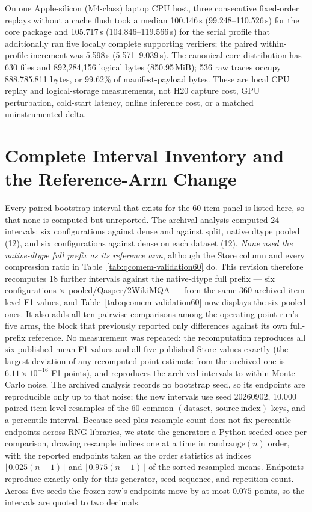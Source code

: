 \documentclass{article}
\begin{document}
On one Apple-silicon (M4-class) laptop CPU host, three consecutive fixed-order
replays without a
cache flush took a median 100.146\,s (99.248--110.526\,s) for the core package
and 105.717\,s (104.846--119.566\,s) for the serial profile that additionally
ran five locally complete supporting verifiers; the paired within-profile
increment was 5.598\,s (5.571--9.039\,s).  The canonical core distribution has
630 files and 892,284,156 logical bytes (850.95\,MiB); 536 raw traces occupy
888,785,811 bytes, or 99.62\% of manifest-payload bytes.  These are local CPU
replay and logical-storage measurements, not H20 capture cost, GPU perturbation,
cold-start latency, online inference cost, or a matched uninstrumented delta.

\section{Complete Interval Inventory and the Reference-Arm Change}
\label{app:all-intervals}

Every paired-bootstrap interval that exists for the 60-item panel is listed
here, so that none is computed but unreported.  The archival analysis computed
24 intervals: six configurations against dense and against split, native dtype pooled
(12), and six configurations against dense on each dataset (12).  \emph{None
used the native-dtype full prefix as its reference arm}, although the Store column and every
compression ratio in Table~\ref{tab:qcomem-validation60} do.  This revision
therefore recomputes 18 further intervals against the native-dtype full prefix --- six
configurations $\times$ pooled/Qasper/2WikiMQA --- from the same 360 archived
item-level F1 values, and Table~\ref{tab:qcomem-validation60} now displays the
six pooled ones.  It also adds all ten pairwise comparisons among the
operating-point run's five arms, the block that previously reported only
differences against its own full-prefix reference.  No measurement was repeated: the recomputation reproduces all
six published mean-F1 values and all five published Store values exactly (the
largest deviation of any recomputed point estimate from the archived one is
$6.11\times10^{-16}$ F1 points), and reproduces the archived intervals to
within Monte-Carlo noise.  The archived analysis records no bootstrap seed, so
its endpoints are reproducible only up to that noise; the new intervals use
seed 20260902, 10,000 paired item-level resamples of the 60 common
$(\mathrm{dataset},\ \mathrm{source\ index})$ keys, and a percentile interval.
Because seed plus resample count does not fix percentile endpoints across RNG
libraries, we state the generator: a Python  seeded once per
comparison, drawing resample indices one at a time in
$\mathrm{randrange}(n)$ order, with the reported endpoints taken as the
order statistics at indices $\lfloor 0.025(n-1)\rfloor$ and
$\lfloor 0.975(n-1)\rfloor$ of the sorted resampled means.  Endpoints reproduce
exactly only for this generator, seed sequence, and repetition count.
Across five seeds the frozen row's endpoints move by at most $0.075$ points, so
the intervals are quoted to two decimals.
\end{document}
